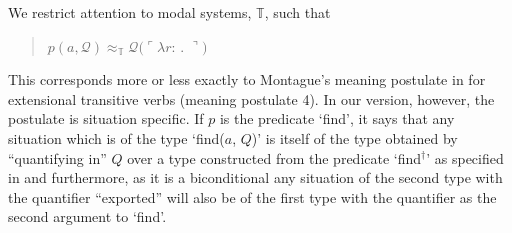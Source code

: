  
 

\begin{ex} 
  We restrict attention to modal systems, $\mathbb{T}$, such that
  \begin{quote}
  $p(a,\mathcal{Q})\approx_{\mathbb{T}}\mathcal{Q}(\ulcorner\lambda
 r$: . $\urcorner)$
  \end{quote}
\label{ex:mp-find} 
\end{ex} 
This corresponds more or less exactly to Montague's meaning postulate
in \cite{Montague1973} for extensional transitive verbs (meaning
postulate 4).  In our version, however, the postulate is situation
specific.  If $p$ is the predicate `find', it says that any situation which is of the type `find($a$,
$Q$)' is itself of the type obtained by ``quantifying in'' $Q$ over a
type constructed from the predicate `find$^{\dagger}$' as specified
in \preveg{} and furthermore, as it is a biconditional any situation
of the second type with the quantifier ``exported'' will also be of
the first type with the quantifier as the second argument to `find'.

